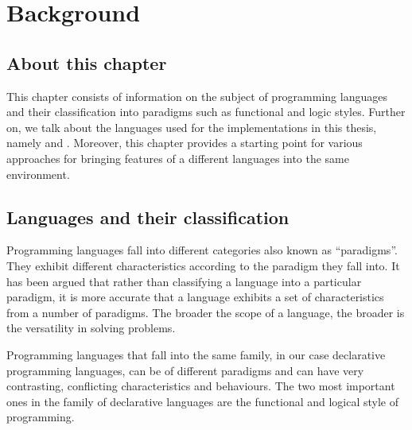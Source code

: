 \documentclass[thesis-solanki.tex]{subfiles}
\begin{document}
\chapter{Background}\label{chap:background}

\section{About this chapter}

This chapter consists of information on the subject of programming languages and their classification into
paradigms such as functional and logic styles.
Further on, we talk about the languages used for the implementations in this thesis, namely  and
.
Moreover, this chapter provides a starting point for various approaches for bringing features of a different
languages into the same environment.


\section{Languages and their classification}
Programming languages fall into different categories also known as ``paradigms''.
They exhibit different characteristics according to the paradigm they fall into.
It has been argued \cite{Krishnamurthi:2008:TPL:1480828.1480846} that rather than classifying a language into a
particular paradigm, it is more accurate that a language exhibits a set of characteristics from a number of
paradigms.
The broader the scope of a language, the broader is the versatility in solving problems.

Programming languages that fall into the same family, in our case declarative programming languages, can be of
different paradigms and can have very contrasting, conflicting characteristics and behaviours.
The two most important ones in the family of declarative languages are the functional and
logical style of programming.
\end{document}
